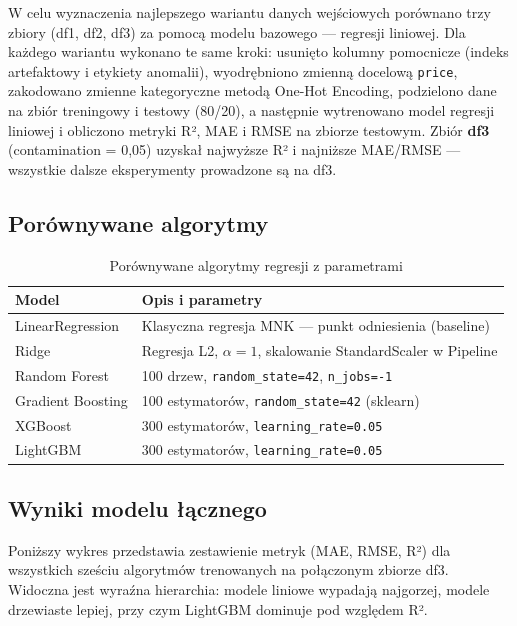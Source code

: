 \documentclass[12pt,a4paper]{article}
\begin{document}
W celu wyznaczenia najlepszego wariantu danych wejściowych porównano trzy
zbiory (df1, df2, df3) za pomocą modelu bazowego --- regresji liniowej.
Dla każdego wariantu wykonano te same kroki: usunięto kolumny pomocnicze
(indeks artefaktowy i etykiety anomalii), wyodrębniono zmienną docelową
\texttt{price}, zakodowano zmienne kategoryczne metodą One-Hot Encoding,
podzielono dane na zbiór treningowy i testowy (80/20), a następnie
wytrenowano model regresji liniowej i obliczono metryki R², MAE i RMSE
na zbiorze testowym. Zbiór \textbf{df3} (contamination = 0,05) uzyskał
najwyższe R² i najniższe MAE/RMSE --- wszystkie dalsze eksperymenty
prowadzone są na df3.
	
	\subsection{Porównywane algorytmy}
	
	\begin{table}[H]
		\centering
		\begin{tabularx}{\textwidth}{lX}
			\toprule
			\textbf{Model} & \textbf{Opis i parametry} \\
			\midrule
			LinearRegression  & Klasyczna regresja MNK --- punkt odniesienia (baseline) \\
			Ridge             & Regresja L2, $\alpha=1$, skalowanie StandardScaler w Pipeline \\
			Random Forest     & 100 drzew, \texttt{random\_state=42}, \texttt{n\_jobs=-1} \\
			Gradient Boosting & 100 estymatorów, \texttt{random\_state=42} (sklearn) \\
			XGBoost           & 300 estymatorów, \texttt{learning\_rate=0.05} \\
			LightGBM          & 300 estymatorów, \texttt{learning\_rate=0.05} \\
			\bottomrule
		\end{tabularx}
		\caption{Porównywane algorytmy regresji z parametrami}
	\end{table}
	
	\subsection{Wyniki modelu łącznego}
	
	Poniższy wykres przedstawia zestawienie metryk (MAE, RMSE, R²) dla wszystkich
	sześciu algorytmów trenowanych na połączonym zbiorze df3. Widoczna jest wyraźna
	hierarchia: modele liniowe wypadają najgorzej, modele drzewiaste lepiej,
	przy czym LightGBM dominuje pod względem R².
	
\end{document}
